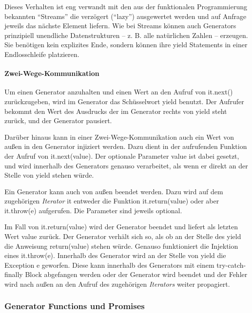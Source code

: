 \documentclass[
11pt, %
a4paper, %
oneside, %
pdfspacing, %
headinclude,
BCOR5mm, %
ngerman, %
bibtotocnumbered,
]{scrartcl}
\begin{document}
		Dieses Verhalten ist eng verwandt mit den aus der funktionalen Programmierung bekannten "`Streams"' die verzögert ("`lazy"') ausgewertet werden und auf Anfrage jeweils das nächste Element liefern. Wie bei Streams können auch Generators prinzipiell unendliche Datenstrukturen -- z. B. alle natürlichen Zahlen -- erzeugen. Sie benötigen kein explizites Ende, sondern können ihre \textsf{yield} Statements in einer Endlosschleife platzieren.
		
		\paragraph{Zwei-Wege-Kommunikation}
		Um einen Generator anzuhalten und einen Wert an den Aufruf von \textsf{it.next()} zurückzugeben, wird im Generator das Schüsselwort \textsf{yield} benutzt. Der Aufrufer bekommt den Wert des Ausdrucks der im Generator rechts von \textsf{yield} steht zurück, und der Generator pausiert.

		Darüber hinaus kann in einer Zwei-Wege-Kommunikation auch ein Wert von außen in den Generator injiziert werden. Dazu dient in der aufrufenden Funktion der Aufruf von \textsf{it.next(value)}. Der optionale Parameter \textsf{value} ist dabei gesetzt, und wird innerhalb des Generators genauso verarbeitet, als wenn er direkt an der Stelle von \textsf{yield} stehen würde.
		
	
		Ein Generator kann auch von außen beendet werden. Dazu wird auf dem zugehörigen \emph{Iterator} \textsf{it} entweder die Funktion \textsf{it.return(value)} oder aber \textsf{it.throw(e)} aufgerufen. Die Parameter sind jeweils optional.
		
		Im  Fall von \textsf{it.return(value)} wird der Generator beendet und liefert als letzten Wert \textsf{value} zurück. Der Generator verhält sich so, als ob an der Stelle des \textsf{yield} die Anweisung \textsf{return(value)} stehen würde. 
		Genauso funktioniert die Injektion eines \textsf{it.throw(e)}. Innerhalb des Generator wird an der Stelle von \textsf{yield} die Exception \textsf{e} geworfen. Diese kann innerhalb des Generators mit einem \textsf{try-catch-finally} Block abgefangen werden oder der Generator wird beendet und der Fehler wird nach außen an den Aufruf des zugehörigen \emph{Iterators} weiter propagiert.
	
	\subsubsection{Generator Functions und Promises}
	
\end{document}

